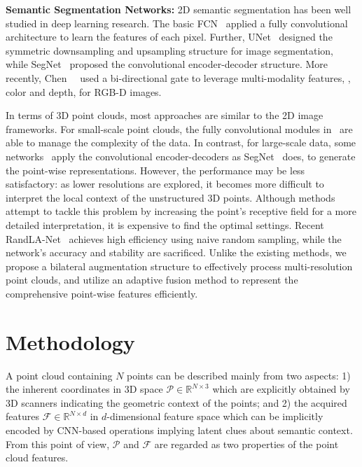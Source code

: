 \documentclass[10pt,twocolumn,letterpaper]{article}
\begin{document}
\vspace{1mm}
\noindent \textbf{Semantic Segmentation Networks:} 2D semantic segmentation has been well studied in deep learning research. The basic FCN~\cite{long2015fully} applied a fully convolutional architecture to learn the features of each pixel. Further, UNet~\cite{ronneberger2015u} designed the symmetric downsampling and upsampling structure for image segmentation, while SegNet~\cite{badrinarayanan2017segnet} proposed the convolutional encoder-decoder structure. More recently, Chen~\etal~\cite{chen2020bidirectional} used a bi-directional gate to leverage multi-modality features, \ie, color and depth, for RGB-D images. 

In terms of 3D point clouds, most approaches are similar to the 2D image frameworks. For small-scale point clouds, the fully convolutional modules in~\cite{qi2017pointnet, wang2019dynamic, qiu2019geometric} are able to manage the complexity of the data. In contrast, for large-scale data, some networks~\cite{qi2017pointnet++, liu2019relation, hu2020randla, yan2020pointasnl} apply the convolutional encoder-decoders as SegNet~\cite{badrinarayanan2017segnet} does, to generate the point-wise representations. However, the performance may be less satisfactory: as lower resolutions are explored, it becomes more difficult to interpret the local context of the unstructured 3D points. Although methods~\cite{engelmann2020dilated, hu2020randla, qiu2021dense} attempt to tackle this problem by increasing the point's receptive field for a more detailed interpretation, it is expensive to find the optimal settings. Recent RandLA-Net~\cite{hu2020randla} achieves high efficiency using naive random sampling, while the network's accuracy and stability are sacrificed. Unlike the existing methods, we propose a bilateral augmentation structure to effectively process multi-resolution point clouds, and utilize an adaptive fusion method to represent the comprehensive point-wise features efficiently.
%
 \section{Methodology}
\label{sec:metho}
A point cloud containing $N$ points can be described mainly from two aspects: 1) the inherent coordinates in 3D space $\mathcal{P}\in\mathbb{R}^{N\times3}$ which are explicitly obtained by 3D scanners indicating the geometric context of the points; and 2) the acquired features $\mathcal{F}\in\mathbb{R}^{N\times d}$ in $d$-dimensional feature space which can be implicitly encoded by CNN-based operations implying latent clues about semantic context. From this point of view, $\mathcal{P}$ and $\mathcal{F}$ are regarded as two properties of the point cloud features.
\end{document}
